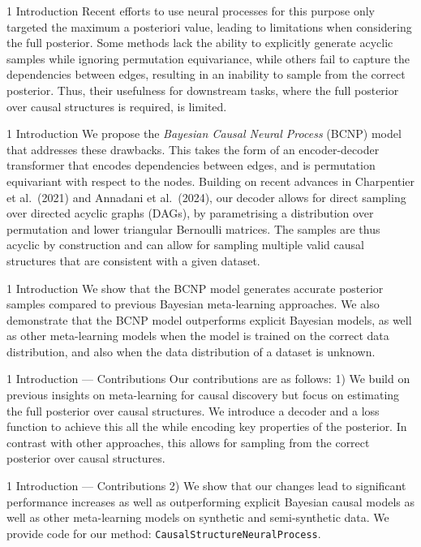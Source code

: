\documentclass[aspectratio=169,10pt]{beamer}
\begin{document}
\begin{frame}{1 Introduction}
Recent efforts to use neural processes for this purpose only targeted the maximum a posteriori value, leading to limitations when considering the full posterior. Some methods lack the ability to explicitly generate acyclic samples while ignoring permutation equivariance, while others fail to capture the dependencies between edges, resulting in an inability to sample from the correct posterior. Thus, their usefulness for downstream tasks, where the full posterior over causal structures is required, is limited.
\end{frame}

\begin{frame}{1 Introduction}
We propose the \textit{Bayesian Causal Neural Process} (BCNP) model that addresses these drawbacks. This takes the form of an encoder-decoder transformer that encodes dependencies between edges, and is permutation equivariant with respect to the nodes. Building on recent advances in Charpentier et al.\ (2021) and Annadani et al.\ (2024), our decoder allows for direct sampling over directed acyclic graphs (DAGs), by parametrising a distribution over permutation and lower triangular Bernoulli matrices. The samples are thus acyclic by construction and can allow for sampling multiple valid causal structures that are consistent with a given dataset.
\end{frame}

\begin{frame}{1 Introduction}
We show that the BCNP model generates accurate posterior samples compared to previous Bayesian meta-learning approaches. We also demonstrate that the BCNP model outperforms explicit Bayesian models, as well as other meta-learning models when the model is trained on the correct data distribution, and also when the data distribution of a dataset is unknown.
\end{frame}

\begin{frame}{1 Introduction --- Contributions}
Our contributions are as follows: 1) We build on previous insights on meta-learning for causal discovery but focus on estimating the full posterior over causal structures. We introduce a decoder and a loss function to achieve this all the while encoding key properties of the posterior. In contrast with other approaches, this allows for sampling from the correct posterior over causal structures.
\end{frame}

\begin{frame}{1 Introduction --- Contributions}
2) We show that our changes lead to significant performance increases as well as outperforming explicit Bayesian causal models as well as other meta-learning models on synthetic and semi-synthetic data. We provide code for our method: \texttt{CausalStructureNeuralProcess}.
\end{frame}
\end{document}
